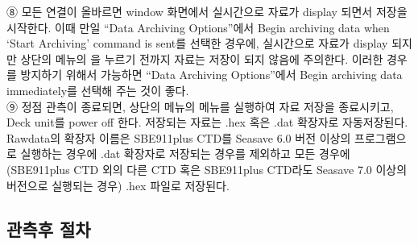 \documentclass[
]{book}
\begin{document}
⑧ 모든 연결이 올바르면 window 화면에서 실시간으로 자료가 display 되면서 저장을 시작한다. 이때 만일 ``Data Archiving Options''에서 Begin archiving data when `Start Archiving' command is sent를 선택한 경우에, 실시간으로 자료가 display 되지만 상단의 메뉴의 을 누르기 전까지 자료는 저장이 되지 않음에 주의한다. 이러한 경우를 방지하기 위해서 가능하면 ``Data Archiving Options''에서 Begin archiving data immediately를 선택해 주는 것이 좋다.\\
⑨ 정점 관측이 종료되면, 상단의 메뉴의 메뉴를 실행하여 자료 저장을 종료시키고, Deck unit를 power off 한다. 저장되는 자료는 .hex 혹은 .dat 확장자로 자동저장된다. Rawdata의 확장자 이름은 SBE911plus CTD를 Seasave 6.0 버전 이상의 프로그램으로 실행하는 경우에 .dat 확장자로 저장되는 경우를 제외하고 모든 경우에 (SBE911plus CTD 외의 다른 CTD 혹은 SBE911plus CTD라도 Seasave 7.0 이상의 버전으로 실행되는 경우) .hex 파일로 저장된다.

\hypertarget{uxad00uxce21uxd6c4-uxc808uxcc28}{%
\subsection{관측후 절차}\label{uxad00uxce21uxd6c4-uxc808uxcc28}}
\end{document}

